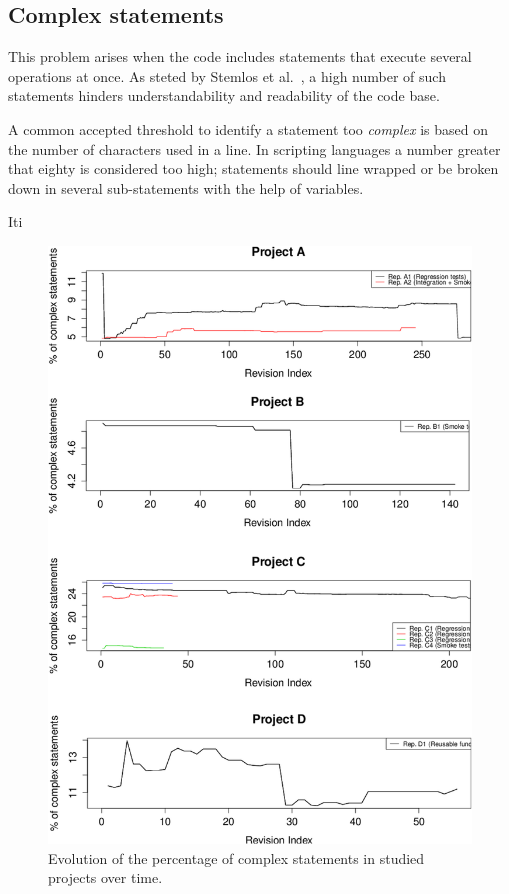 \subsection{Complex statements}
This problem arises when the code includes statements that execute several operations at once. As steted by Stemlos et al.\ \cite{metrics_source_code}, a high number of such statements hinders understandability and readability of the code base.

A common accepted threshold to identify a statement too \textit{complex} is based on the number of characters used in a line. In scripting languages a number greater that eighty is considered too high; statements should line wrapped or be broken down in several sub-statements with the help of variables.

Iti

\begin{figure}[!htbp]
    \centering
    \includegraphics[width=\textwidth,keepaspectratio]{figure/results/rq1/perc-complex-statements.pdf}
    \caption{Evolution of the percentage of complex statements in studied projects over time.}
    \label{fig:perc-complex-statements}
\end{figure}

